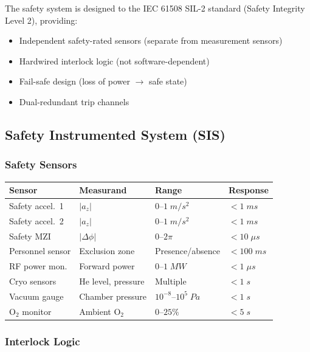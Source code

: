 \documentclass[11pt,a4paper]{article}
\begin{document}
The safety system is designed to the IEC 61508 SIL-2 standard
(Safety Integrity Level 2), providing:
\begin{itemize}[nosep]
\item Independent safety-rated sensors (separate from measurement
sensors)
\item Hardwired interlock logic (not software-dependent)
\item Fail-safe design (loss of power $\to$ safe state)
\item Dual-redundant trip channels
\end{itemize}

\subsection{Safety Instrumented System (SIS)}

\subsubsection{Safety Sensors}

\begin{longtable}{p{}p{}p{}p{}}
\toprule
\textbf{Sensor} & \textbf{Measurand} & \textbf{Range} & \textbf{Response} \\
\midrule
\endhead
Safety accel.~1 & $|a_z|$ & $0$--$1\;\si{m/s^2}$ & $< 1\;\si{ms}$ \\
Safety accel.~2 & $|a_z|$ & $0$--$1\;\si{m/s^2}$ & $< 1\;\si{ms}$ \\
Safety MZI & $|\Delta\phi|$ & $0$--$2\pi$ & $< 10\;\si{\mu s}$ \\
Personnel sensor & Exclusion zone & Presence/absence & $< 100\;\si{ms}$ \\
RF power mon. & Forward power & $0$--$1\;\si{MW}$ & $< 1\;\si{\mu s}$ \\
Cryo sensors & He level, pressure & Multiple & $< 1\;\si{s}$ \\
Vacuum gauge & Chamber pressure & $10^{-8}$--$10^5\;\si{Pa}$ & $< 1\;\si{s}$ \\
O$_2$ monitor & Ambient O$_2$ & $0$--$25\%$ & $< 5\;\si{s}$ \\
\bottomrule
\end{longtable}

\subsubsection{Interlock Logic}
\end{document}
